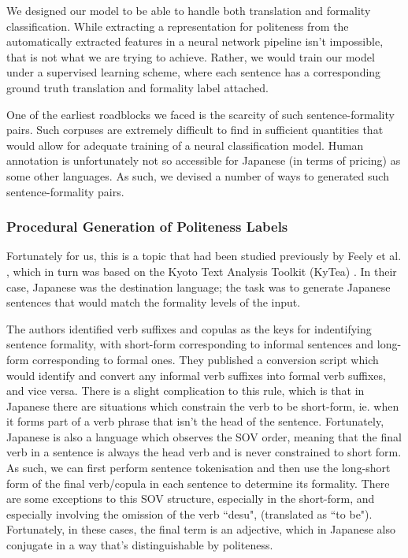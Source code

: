 \documentclass[11pt]{article}
\begin{document}
We designed our model to be able to handle both translation and formality classification. While extracting a representation for politeness from the automatically extracted features in a neural network pipeline isn't impossible, that is not what we are trying to achieve. Rather, we would train our model under a supervised learning scheme, where each sentence has a corresponding ground truth translation and formality label attached.

One of the earliest roadblocks we faced is the scarcity of such sentence-formality pairs. Such corpuses are extremely difficult to find in sufficient quantities that would allow for adequate training of a neural classification model. Human annotation is unfortunately not so accessible for Japanese (in terms of pricing) as some other languages. As such, we devised a number of ways to generated such sentence-formality pairs.

\subsubsection{Procedural Generation of Politeness Labels}

Fortunately for us, this is a topic that had been studied previously by Feely et al. \cite{Feely:19}, which in turn was based on the Kyoto Text Analysis Toolkit (KyTea) \cite{Neubig:11}. In their case, Japanese was the destination language; the task was to generate Japanese sentences that would match the formality levels of the input. 

The authors identified verb suffixes and copulas as the keys for indentifying sentence formality, with short-form corresponding to informal sentences and long-form corresponding to formal ones. They published a conversion script which would identify and convert any informal verb suffixes into formal verb suffixes, and vice versa. There is a slight complication to this rule, which is that in Japanese there are situations which constrain the verb to be short-form, ie. when it forms part of a verb phrase that isn't the head of the sentence. Fortunately, Japanese is also a language which observes the SOV order, meaning that the final verb in a sentence is always the head verb and is never constrained to short form. As such, we can first perform sentence tokenisation and then use the long-short form of the final verb/copula in each sentence to determine its formality. There are some exceptions to this SOV structure, especially in the short-form, and especially involving the omission of the verb ``desu", (translated as ``to be"). Fortunately, in these cases, the final term is an adjective, which in Japanese also conjugate in a way that's distinguishable by politeness. 
\end{document}

